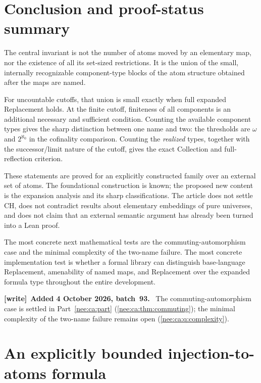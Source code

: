 \documentclass[11pt,letterpaper]{article}
\numberwithin{equation}{section}
\theoremstyle{plain}
\theoremstyle{definition}
\theoremstyle{remark}
\newenvironment{writenote}[1][]{\par\smallskip\begingroup\small\raggedright
 \setlength{\parindent}{1.25em}\noindent\textbf{[write]}\if\relax\detokenize{#1}\relax\else~\textbf{#1.}\fi\ }%
 {\par\endgroup\smallskip}
\begin{document}
\section{Conclusion and proof-status summary}\label{nee:sec:conclusion}
The central invariant is not the number of atoms moved by an elementary map, nor the existence of all its set-sized restrictions. It is the union of the small, internally recognizable component-type blocks of the atom structure obtained after the maps are named.

For uncountable cutoffs, that union is small exactly when full expanded Replacement holds. At the finite cutoff, finiteness of all components is an additional necessary and sufficient condition. Counting the available component types gives the sharp distinction between one name and two: the thresholds are $\omega$ and $2^{\aleph_0}$ in the cofinality comparison. Counting the \emph{realized} types, together with the successor/limit nature of the cutoff, gives the exact Collection and full-reflection criterion.

These statements are proved for an explicitly constructed family over an external set of atoms. The foundational construction is known; the proposed new content is the expansion analysis and its sharp classifications. The article does not settle CH, does not contradict results about elementary embeddings of pure universes, and does not claim that an external semantic argument has already been turned into a Lean proof.

The most concrete next mathematical tests are the commuting-automorphism case and the minimal complexity of the two-name failure. The most concrete implementation test is whether a formal library can distinguish base-language Replacement, amenability of named maps, and Replacement over the expanded formula type throughout the entire development.

\begin{writenote}[Added 4 October 2026, batch~93]
The commuting-automorphism case is settled in Part~\ref{nee:ca:part} (\cref{nee:ca:thm:commuting}); the minimal complexity of the two-name failure remains open (\cref{nee:ca:q:complexity}).
\end{writenote}

\appendix
\section{An explicitly bounded injection-to-atoms formula}\label{nee:app:bounded}
\end{document}
